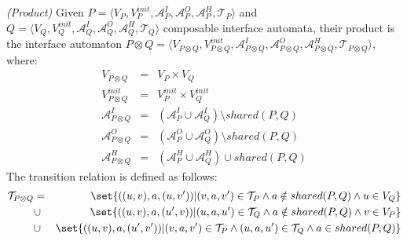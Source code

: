 \begin{definition}\label{def:ia-product}\emph{(Product)}
Given $P=\langle V_P, V_P^{init}, \mathcal{A}_P^I, \mathcal{A}_P^O, \mathcal{A}_P^H, \mathcal{T}_P \rangle$ and $Q=\langle V_Q, V_Q^{init}, \mathcal{A}_Q^I, \mathcal{A}_Q^O, \mathcal{A}_Q^H, \mathcal{T}_Q \rangle$ composable interface automata, their product is the interface automaton $P\otimes Q=\langle V_{P\otimes Q}, V_{P\otimes Q}^{init}, \mathcal{A}_{P\otimes Q}^I, \mathcal{A}_{P\otimes Q}^O, \mathcal{A}_{P\otimes Q}^H, \mathcal{T}_{P\otimes Q} \rangle$, where:\\
\begin{eqnarray*}
  V_{P\otimes Q} &=& V_P \times V_Q \nonumber\\
  V_{P\otimes Q}^{init} &=& V_{P}^{init} \times V_{Q}^{init} \nonumber\\
  \mathcal{A}_{P\otimes Q}^I &=& (\mathcal{A}_{P}^I \cup \mathcal{A}_{Q}^I)\setminus shared(P,Q)\nonumber\\
  \mathcal{A}_{P\otimes Q}^O &=& (\mathcal{A}_{P}^O \cup \mathcal{A}_{Q}^O)\setminus shared(P,Q)\nonumber\\
  \mathcal{A}_{P\otimes Q}^H &=& (\mathcal{A}_{P}^H \cup \mathcal{A}_{Q}^H)\cup shared(P,Q)\nonumber
\end{eqnarray*}
The transition relation is defined as follows:
\begin{eqnarray*}
  \mathcal{T}_{P\otimes Q} &=& \set{((u,v),a,(u,v')) | (v,a,v')\in\mathcal{T}_{P} \wedge a\notin shared(P,Q) \wedge u\in V_Q} \nonumber\\
      &\cup & \set{((u,v),a,(u',v)) | (u,a,u')\in\mathcal{T}_{Q} \wedge a\notin shared(P,Q) \wedge v\in V_P} \nonumber\\
      &\cup& \set{((u,v),a,(u',v')) | (v,a,v')\in\mathcal{T}_{P} \wedge (u,a,u')\in\mathcal{T}_{Q} \wedge a\in shared(P,Q)} \nonumber
\end{eqnarray*}
\end{definition}

